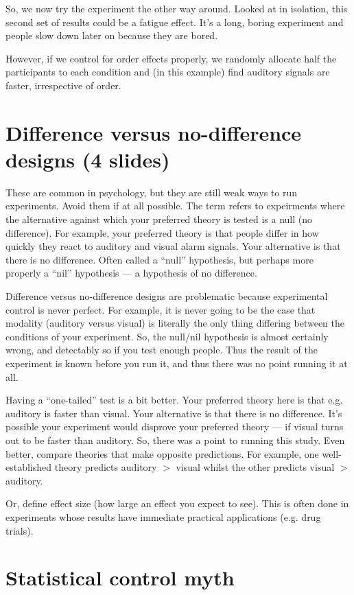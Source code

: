 \documentclass[12pt]{article}
\begin{document}
So, we now try the experiment the other way around. Looked at in
isolation, this second set of results could be a fatigue effect. It's
a long, boring experiment and people slow down later on because they
are bored.

However, if we control for order effects properly, we randomly
allocate half the participants to each condition and (in this example)
find auditory signals are faster, irrespective of order.

\section{Difference versus no-difference designs (4 slides)}

These are common in psychology, but they are still weak ways to run
experiments. Avoid them if at all possible. The term refers to
expeirments where the alternative against which your preferred theory
is tested is a null (no difference). For example, your preferred
theory is that people differ in how quickly they react to auditory and
visual alarm signals. Your alternative is that there is no
difference. Often called a ``null'' hypothesis, but perhaps more
properly a ``nil'' hypothesis --- a hypothesis of no difference.

Difference versus no-difference designs are problematic because
experimental control is never perfect. For example, it is never going
to be the case that modality (auditory versus visual) is literally the
only thing differing between the conditions of your experiment. So,
the null/nil hypothesis is almost certainly wrong, and detectably so
if you test enough people. Thus the result of the experiment is known
before you run it, and thus there was no point running it at all.

Having a ``one-tailed'' test is a bit better. Your preferred theory
here is that e.g. auditory is faster than visual. Your alternative is
that there is no difference. It's possible your experiment would
disprove your preferred theory --- if visual turns out to be faster
than auditory. So, there was a point to running this study. Even
better, compare theories that make opposite predictions. For example,
one well-established theory predicts auditory $>$ visual whilst the
other predicts visual $>$ auditory.

Or, define effect size (how large an effect you expect to see). This
is often done in experiments whose results have immediate practical
applications (e.g. drug trials).

\section{Statistical control myth}
\end{document}
